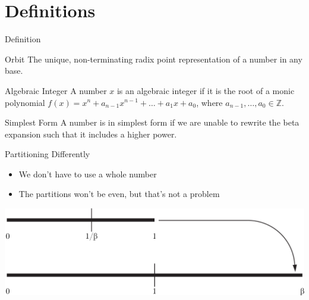 \documentclass{beamer}
\begin{document}
\section{Definitions}
\begin{frame}{Definition}
  \begin{block}{Orbit}
    The unique, non-terminating radix point representation of a number in any base.
  \end{block}

  \begin{block}{Algebraic Integer}
    A number $x$ is an algebraic integer if it is the root of a monic polynomial $f(x) = x^n + a_{n-1}x^{n-1}+\dots+a_1x+a_0$, where $a_{n-1},\dots,a_0\in\mathbb{Z}$.
  \end{block}

  \begin{block}{Simplest Form}
    A number is in simplest form if we are unable to rewrite the beta expansion such that it includes a higher power.
  \end{block}
\end{frame}












            \begin{frame}{Partitioning Differently}
              \begin{itemize}
                \item We don't have to use a whole number
                \item The partitions won't be even, but that's not a problem
              \end{itemize}
              \includegraphics[width=\textwidth]{images/partitioning/partitioningbeta}
            \end{frame}
\end{document}
